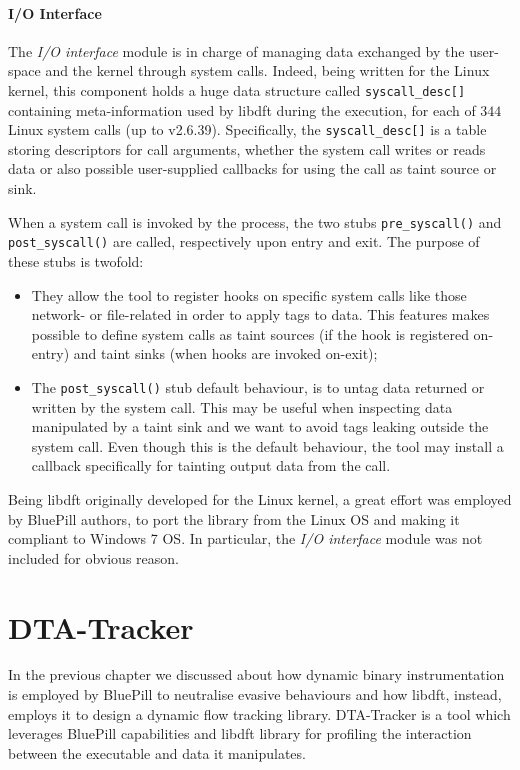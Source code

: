 \documentclass[LaM,binding=0.6cm]{sapthesis}
\begin{document}
\subsubsection{I/O Interface}
The \textit{I/O interface} module is in charge of managing data exchanged by the user-space and the kernel through system calls. Indeed, being written for the Linux kernel, this component holds a huge data structure called \texttt{syscall\_desc[]} containing meta-information used by libdft during the execution, for each of $344$ Linux system calls (up to v2.6.39). Specifically, the \texttt{syscall\_desc[]} is a table storing descriptors for call arguments, whether the system call writes or reads data or also possible user-supplied callbacks for using the call as taint source or sink.

When a system call is invoked by the process, the two stubs \texttt{pre\_syscall()} and \texttt{post\_syscall()} are called, respectively upon entry and exit. The purpose of these stubs is twofold:
\begin{itemize}
\item They allow the tool to register hooks on specific system calls like those network- or file-related in order to apply tags to data. This features makes possible to define system calls as taint sources (if the hook is registered on-entry) and taint sinks (when hooks are invoked on-exit);
\item The \texttt{post\_syscall()} stub default behaviour, is to untag data returned or written by the system call. This may be useful when inspecting data manipulated by a taint sink and we want to avoid tags leaking outside the system call. Even though this is the default behaviour, the tool may install a callback specifically for tainting output data from the call.
\end{itemize}

\noindent
Being libdft originally developed for the Linux kernel, a great effort was employed by BluePill authors, to port the library from the Linux OS and making it compliant to Windows 7 OS. In particular, the \textit{I/O interface} module was not included for obvious reason.

\chapter{DTA-Tracker}
\label{ch:dta-tracker}
In the previous chapter we discussed about how dynamic binary instrumentation is employed by BluePill to neutralise evasive behaviours and how libdft, instead, employs it to design a dynamic flow tracking library. {\sf DTA-Tracker} is a tool which leverages BluePill capabilities and libdft library for profiling the interaction between the executable and data it manipulates.\\
\end{document}
